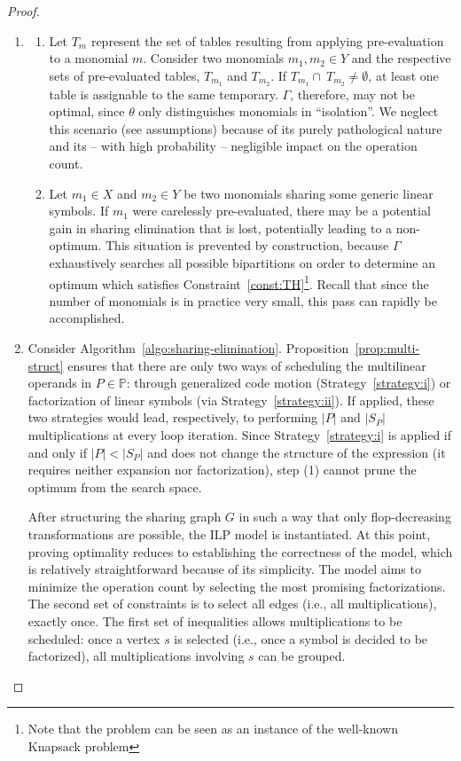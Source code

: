 \begin{proof}
\begin{enumerate}
\item 
\begin{enumerate}
\item Let $T_m$ represent the set of tables resulting from applying pre-evaluation to a monomial $m$. Consider two monomials $m_1, m_2 \in Y$ and the respective sets of pre-evaluated tables, $T_{m_{1}}$ and $T_{m_{2}}$. If $T_{m_{1}} \cap\ T_{m_{2}} \neq \emptyset$, at least one table is assignable to the same temporary. $\Gamma$, therefore, may not be optimal, since $\theta$ only distinguishes monomials in ``isolation''. We neglect this scenario (see assumptions) because of its purely pathological nature and its -- with high probability -- negligible impact on the operation count.
\item Let $m_1 \in X$ and $m_2 \in Y$ be two monomials sharing some generic linear symbols. If $m_1$ were carelessly pre-evaluated, there may be a potential gain in sharing elimination that is lost, potentially leading to a non-optimum. This situation is prevented by construction, because $\Gamma$ exhaustively searches all possible bipartitions on order to determine an optimum which satisfies Constraint~\ref{const:TH}\footnote{Note that the problem can be seen as an instance of the well-known Knapsack problem}. Recall that since the number of monomials is in practice very small, this pass can rapidly be accomplished.
\end{enumerate}
\item Consider Algorithm~\ref{algo:sharing-elimination}. Proposition~\ref{prop:multi-struct} ensures that there are only two ways of scheduling the multilinear operands in $P \in \mathbb{P}$: through generalized code motion (Strategy~\ref{strategy:i}) or factorization of linear symbols (via Strategy~\ref{strategy:ii}). If applied, these two strategies would lead, respectively, to performing $|P|$ and $|S_P|$ multiplications at every loop iteration. Since Strategy~\ref{strategy:i} is applied if and only if $|P| < |S_P|$ and does not change the structure of the expression (it requires neither expansion nor factorization), step (1) cannot prune the optimum from the search space. 

After structuring the sharing graph $G$ in such a way that only flop-decreasing transformations are possible, the ILP model is instantiated. At this point, proving optimality reduces to establishing the correctness of the model, which is relatively straightforward because of its simplicity. The model aims to minimize the operation count by selecting the most promising factorizations. The second set of constraints is to select all edges (i.e., all multiplications), exactly once. The first set of inequalities allows multiplications to be scheduled: once a vertex $s$ is selected (i.e., once a symbol is decided to be factorized), all multiplications involving $s$ can be grouped. 
\end{enumerate}
\end{proof}


